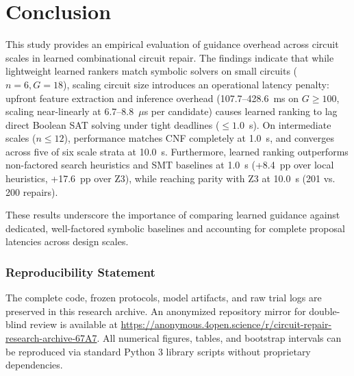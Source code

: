 \documentclass[11pt]{article}
\begin{document}
\section{Conclusion}
This study provides an empirical evaluation of guidance overhead across circuit scales in learned combinational circuit repair. The findings indicate that while lightweight learned rankers match symbolic solvers on small circuits ($n=6, G=18$), scaling circuit size introduces an operational latency penalty: upfront feature extraction and inference overhead (107.7--428.6~ms on $G \ge 100$, scaling near-linearly at 6.7--8.8~$\mu$s per candidate) causes learned ranking to lag direct Boolean SAT solving under tight deadlines ($\le 1.0$~s). On intermediate scales ($n \le 12$), performance matches CNF completely at 1.0~s, and converges across five of six scale strata at 10.0~s. Furthermore, learned ranking outperforms non-factored search heuristics and SMT baselines at 1.0~s (+8.4~pp over local heuristics, +17.6~pp over Z3), while reaching parity with Z3 at 10.0~s (201 vs. 200 repairs).

These results underscore the importance of comparing learned guidance against dedicated, well-factored symbolic baselines and accounting for complete proposal latencies across design scales.

\subsubsection*{Reproducibility Statement}
The complete code, frozen protocols, model artifacts, and raw trial logs are preserved in this research archive. An anonymized repository mirror for double-blind review is available at \url{https://anonymous.4open.science/r/circuit-repair-research-archive-67A7}. All numerical figures, tables, and bootstrap intervals can be reproduced via standard Python 3 library scripts without proprietary dependencies.



\end{document}
